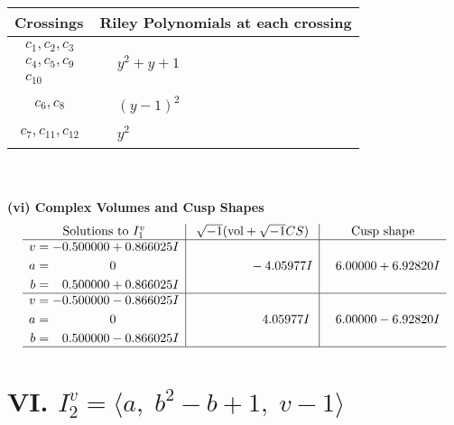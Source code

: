 \documentclass[1p]{elsarticle_modified}
\theoremstyle{definition}
\newcommand{\I}{\sqrt{-1}}
\begin{document}
\begin{tabular}{m{50pt}|m{274pt}}
Crossings & \hspace{64pt}Riley Polynomials at each crossing \\
\hline $$\begin{aligned}c_{1},c_{2},c_{3}\\c_{4},c_{5},c_{9}\\c_{10}\end{aligned}$$&$\begin{aligned}
&y^2+y+1
\end{aligned}$\\
\hline $$\begin{aligned}c_{6},c_{8}\end{aligned}$$&$\begin{aligned}
&(y-1)^2
\end{aligned}$\\
\hline $$\begin{aligned}c_{7},c_{11},c_{12}\end{aligned}$$&$\begin{aligned}
&y^2
\end{aligned}$\\
\hline
\end{tabular}\\~\\
\newpage\flushleft \textbf{(vi) Complex Volumes and Cusp Shapes}
$$\begin{array}{c|c|c}  
\text{Solutions to }I^v_{1}& \I (\text{vol} + \sqrt{-1}CS) & \text{Cusp shape}\\
 \hline 
\begin{aligned}
v &= -0.500000 + 0.866025 I \\
a &= \phantom{-0.000000 } 0 \\
b &= \phantom{-}0.500000 + 0.866025 I\end{aligned}
 & \phantom{-0.000000 } -4.05977 I & \phantom{-}6.00000 + 6.92820 I \\ \hline\begin{aligned}
v &= -0.500000 - 0.866025 I \\
a &= \phantom{-0.000000 } 0 \\
b &= \phantom{-}0.500000 - 0.866025 I\end{aligned}
 & \phantom{-0.000000 -}4.05977 I & \phantom{-}6.00000 - 6.92820 I\\
 \hline 
 \end{array}$$\newpage\newpage\renewcommand{\arraystretch}{1}
\centering \section*{VI. $I^v_{2}= \langle a,\;b^2- b+1,\;v-1 \rangle$}
\end{document}
